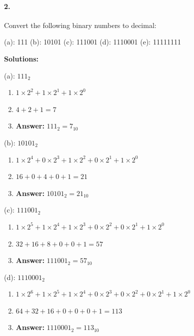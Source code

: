 \documentclass{article}
\begin{document}
\paragraph*{2.}
Convert the following binary numbers to decimal:

\vspace*{0.25cm}

(a): 111 (b): 10101 (c): 111001 (d): 1110001 (e): 11111111

\vspace*{0.5cm}

\noindent \textbf{Solutions:}

\vspace*{0.25cm}

\noindent (a): $111_2$

\begin{enumerate}
    \item $1 \times 2^2 + 1 \times 2^1 + 1 \times 2^0$
    \item $4 + 2 + 1 = 7$
    \item \textbf{Answer:} $111_2 = 7_{10}$
\end{enumerate}

\vspace*{0.5cm}

\noindent (b): $10101_2$

\begin{enumerate}
    \item $1 \times 2^4 + 0 \times 2^3 + 1 \times 2^2 + 0 \times 2^1 + 1 \times 2^0$
    \item $16 + 0 + 4 + 0 + 1 = 21$
    \item \textbf{Answer:} $10101_2 = 21_{10}$
\end{enumerate}

\vspace*{0.5cm}

\noindent (c): $111001_2$

\begin{enumerate}
    \item $1 \times 2^5 + 1 \times 2^4 + 1 \times 2^3 + 0 \times 2^2 + 0 \times 2^1 + 1 \times 2^0$
    \item $32 + 16 + 8 + 0 + 0 + 1 = 57$
    \item \textbf{Answer:} $111001_2 = 57_{10}$
\end{enumerate}

\vspace*{0.5cm}

\noindent (d): $1110001_2$

\begin{enumerate}
    \item $1 \times 2^6 + 1 \times 2^5 + 1 \times 2^4 + 0 \times 2^3 + 0 \times 2^2 + 0 \times 2^1 + 1 \times 2^0$
    \item $64 + 32 + 16 + 0 + 0 + 0 + 1 = 113$
    \item \textbf{Answer:} $1110001_2 = 113_{10}$
\end{enumerate}
\end{document}
